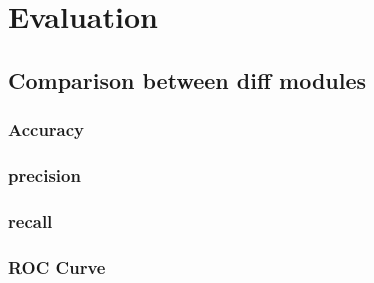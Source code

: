 \chapter{Evaluation}

\section{Comparison between diff modules }

\subsection{Accuracy}
\subsection{precision}
\subsection{recall}
\subsection{ROC Curve}

